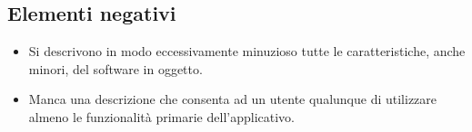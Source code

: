 \documentclass[a4paper,12pt]{report}
\begin{document}
\subsection*{Elementi negativi}
\begin{itemize}
 \item Si descrivono in modo eccessivamente minuzioso tutte le caratteristiche, anche minori, del software in oggetto.
 \item Manca una descrizione che consenta ad un utente qualunque di utilizzare almeno le funzionalità primarie dell'applicativo.
\end{itemize}



\end{document}
